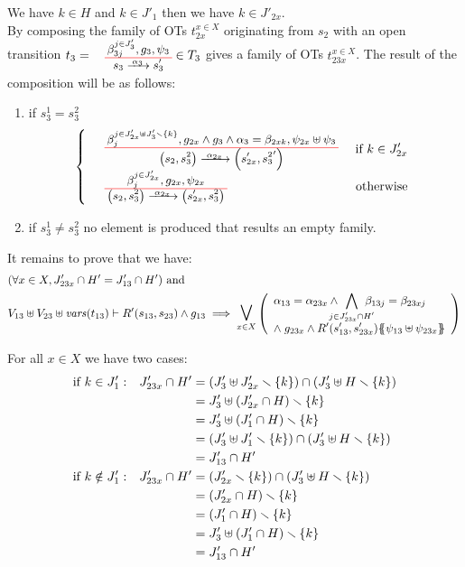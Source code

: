 \documentclass[runningheads]{llncs}
\begin{document}
\begin{enumerate}
We have  $k \in H$ and $k \in J'_{1}$ then  we have $k \in J'_{2x}$.\\
By composing the family of OTs  $t_{2x}^{x\in X}$ originating from  $s_2$ with an open transition $t_3=\OTx{3}{}{3}{3} \in T_3$
gives a family of OTs $t_{23x}^{x\in X}$.  The result of the composition will be as follows:
\begin{enumerate}
\item if $ s^1_3=s^2_3$
\[
\choice{
\OT{\mpar{s_2, s^2_3}}{\mpar{s'_{2x}, {s^2_3}'}}{\alpha_{2x}}{\beta_j^{j \in J'_{2x} \uplus J'_3 \setminus \{k\}}}{g_{2x} \wedge g_3 \wedge \alpha_3 = \beta_{2xk}}{\psi_{2x} \uplus \psi_3} & \text{ if } k \in J'_{2x} \\
\OT{\mpar{s_2, s^2_3}}{\mpar{s'_{2x}, s^2_3}}{\alpha_{2x}}{\beta_j^{j \in J'_{2x}}}{g_{2x}}{\psi_{2x}}& \text{otherwise}
}
\]
\item if $s^1_3 \neq s^2_3$ no element is produced that results an empty family.
\end{enumerate}

It remains to prove that we have:
\begin{align*}		
		&\mpar{\forall x \in X, J'_{23x} \cap H' = J'_{13} \cap H'} \text{ and }\\
		&  V_{13} \uplus V_{23} \uplus \fvars{t_{13}} \vdash R'\mpar{s_{13}, s_{23}} \wedge g_{13} \implies \operatorname*{\bigsymb{\bigvee}}_{x \in X} \mpar{\everymath{\displaystyle}\begin{array}{l}
			\alpha_{13} = \alpha_{23x} \wedge \bigwedge_\subbox{j \in J'_{23x} \cap H'} \beta_{13j} = \beta_{23xj} \\[12pt]
			\nwedge g_{23x} \wedge R'\mpar{s'_{13}, s'_{23x}}\psubst{\psi_{13} \uplus \psi_{23x}}
		\end{array}} 
	\end{align*}
	
For all $x \in X$ we have two cases:
\begin{align*}
		\text{if } k \in J'_1: && J'_{23x} \cap H' & = {\left(J'_{3} \uplus J'_{2x} \smallsetminus {\left\{k\right\}}\right)} \cap  {\left(J'_{3} \uplus H \smallsetminus{\left\{k\right\}}\right)}\\
		&&& = J'_{3}  \uplus {\left(J'_{2x} \cap H\right)} \smallsetminus {\left\{k\right\}} \\
		&&& = J'_{3} \uplus {\left(J'_1 \cap H\right)} \smallsetminus {\left\{k\right\}} \\
		&&& = {\left( J'_{3} \uplus J'_1 \smallsetminus {\left\{k\right\}}\right)} \cap {\left(J'_{3} \uplus H \smallsetminus{\left\{k\right\}}\right)}\\
		&&& = J'_{13} \cap H'\\
\text{if } k \notin J'_1: && J'_{23x} \cap H' & = {\left(J'_{2x} \smallsetminus {\left\{k\right\}}\right)} \cap {\left(J'_3 \uplus H \smallsetminus{\left\{k\right\}}\right)} \\
		&&& = {\left(J'_{2x} \cap H\right)} \smallsetminus {\left\{k\right\}} \\
		&&& = {\left(J'_1 \cap H\right)} \smallsetminus {\left\{k\right\}}  \\
		&&& = J'_3 \uplus {\left(J'_1 \cap H\right)} \smallsetminus {\left\{k\right\}}  \\
		&&& = J'_{13} \cap H'
		\end{align*}
	


\end{enumerate}
\end{document}
